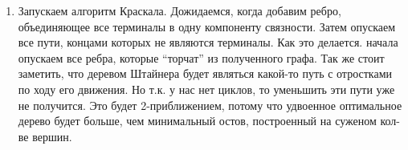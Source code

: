 \documentclass{article}
\begin{document}
\begin{enumerate}
\begin{enumerate}
\item

Запускаем алгоритм Краскала. Дожидаемся, когда добавим ребро,
объединяющее все терминалы в одну компоненту связности. Затем опускаем
все пути, концами которых не являются терминалы. Как это
делается. начала опускаем все ребра, которые ``торчат'' из полученного
графа. Так же стоит заметить, что деревом Штайнера будет являться
какой-то путь с отростками по ходу его движения. Но т.к. у нас нет
циклов, то уменьшить эти пути уже не получится. Это будет
2-приближением, потому что удвоенное оптимальное дерево будет больше,
чем минимальный остов, построенный на суженом кол-ве вершин.

\end{enumerate}

\end{enumerate}
\end{document}
